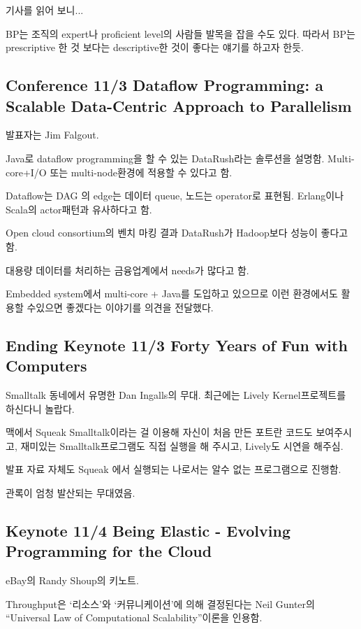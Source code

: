 \documentclass[a4paper]{article}
\begin{document}
기사를 읽어 보니...

BP는 조직의 expert나 proficient level의 사람들 발목을 잡을 수도 있다.
따라서 BP는 prescriptive 한 것 보다는 descriptive한 것이 좋다는 얘기를
하고자 한듯.
 
\subsection{Conference 11/3 Dataflow Programming: a Scalable
  Data-Centric Approach to Parallelism}
 
발표자는 Jim Falgout.
 
Java로 dataflow programming을 할 수 있는 DataRush라는 솔루션을 설명함.
Multi-core+I/O 또는 multi-node환경에 적용할 수 있다고 함.
 
Dataflow는 DAG 의 edge는 데이터 queue, 노드는 operator로 표현됨.
Erlang이나 Scala의 actor패턴과 유사하다고 함.
 
Open cloud consortium의 벤치 마킹 결과 DataRush가 Hadoop보다 성능이 좋다고 함.
 
대용량 데이터를 처리하는 금융업계에서 needs가 많다고 함. 
 
Embedded system에서 multi-core + Java를 도입하고 있으므로 이런
환경에서도 활용할 수있으면 좋겠다는 이야기를 의견을 전달했다.
 
\subsection{Ending Keynote 11/3 Forty Years of Fun with Computers}
 
Smalltalk 동네에서 유명한 Dan Ingalls의 무대.
최근에는  Lively Kernel프로젝트를 하신다니 놀랍다.
 
맥에서 Squeak Smalltalk이라는 걸 이용해 자신이 처음 만든 포트란 코드도
보여주시고, 재미있는 Smalltalk프로그램도 직접 실행을 해 주시고,
Lively도 시연을 해주심.
 
발표 자료 자체도 Squeak 에서 실행되는 나로서는 알수 없는 프로그램으로
진행함.
 
관록이 엄청 발산되는 무대였음. 
 
\subsection{Keynote 11/4 Being Elastic - Evolving Programming for the Cloud}
 
eBay의 Randy Shoup의 키노트.
 
Throughput은 `리소스'와 `커뮤니케이션'에 의해 결정된다는 Neil Gunter의
``Universal Law of Computational Scalability''이론을 인용함.
\end{document}
